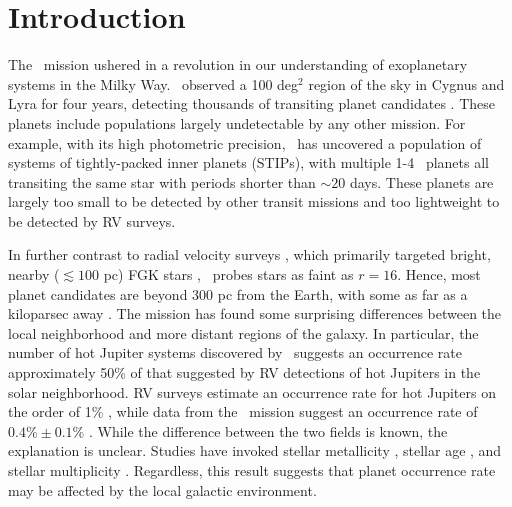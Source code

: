 
\section{Introduction}
\label{sec:intro}

The \kep\ mission \citep{Borucki10} ushered in a revolution in our
understanding of exoplanetary systems in the Milky Way.
\kep\ observed a 100 deg$^2$ region of the sky in Cygnus and Lyra for
four years, detecting thousands of transiting planet candidates
\citep{Batalha13, Burke14, Mullally15, Rowe15}.  These planets include
populations largely undetectable by any other mission. For example,
with its high photometric precision, \kep\ has uncovered a population
of systems of tightly-packed inner planets (STIPs), with multiple 1-4
\rearth\ planets all transiting the same star with periods shorter than
$\sim 20$ days. These planets are largely too small to be detected by
other transit missions and too lightweight to be detected by RV
surveys.

In further contrast to radial velocity surveys \citep[e.g.][]{Udry07,
  Ford14}, which primarily targeted bright, nearby ($\lesssim 100$ pc)
FGK stars \citep{Valenti05, Ammons06}, \kep\, probes stars as faint as
$r = 16$. Hence, most \kep\, planet candidates are beyond 300 pc from
the Earth, with some as far as a kiloparsec away \citep{Lillo-Box14,
  Barclay15, Quinn15}.  The mission has found some surprising
differences between the local neighborhood and more distant regions of
the galaxy.  In particular, the number of hot Jupiter systems
discovered by \kep\ suggests an occurrence rate approximately 50\% of
that suggested by RV detections of hot Jupiters in the solar
neighborhood.  RV surveys estimate an occurrence rate for hot Jupiters
on the order of 1\% \citep{Cumming08, Mayor11}, while data from the
\kep\ mission suggest an occurrence rate of $0.4\% \pm 0.1\%$
\citep{Howard12}.  
While the difference between the two fields is known, the
explanation is unclear. Studies have invoked stellar metallicity
\citep{Howard12, Wright12, Dawson13}, stellar age \citep{Schlaufman13}, and
stellar multiplicity \citep{Wang14, Wang15a}. Regardless, this result
suggests that planet occurrence rate may be affected by the local
galactic environment. 

